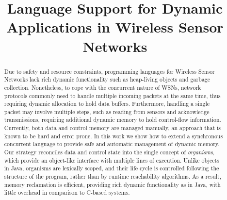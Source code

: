 \documentclass{llncs}
\begin{document}
\title{Language Support for Dynamic Applications in Wireless Sensor Networks}

\begin{comment}
\author{
John Smith and Mary Smith}
\institute{University of North Texas\\
           Computer Science Department\\
           Denton, TX, 76203-1366\\
           john@unt.edu, mary@cs.unt.edu}
\end{comment}

\maketitle

\begin{abstract}

Due to safety and resource constraints, programming languages for Wireless 
Sensor Networks lack rich dynamic functionality such as heap-living objects and 
garbage collection.
%
Nonetheless, to cope with the concurrent nature of WSNs, network protocols 
commonly need to handle multiple incoming packets at the same time, thus 
requiring dynamic allocation to hold data buffers.
%
Furthermore, handling a single packet may involve multiple steps, such as 
reading from sensors and acknowledge transmissions, requiring additional 
dynamic memory to hold control-flow information.
%
Currently, both data and control memory are managed manually, an approach that 
is known to be hard and error prone.
%
In this work we show how to extend a synchronous concurrent language to provide 
safe and automatic management of dynamic memory.
Our strategy reconciles data and control state into the single concept of 
\emph{organisms}, which provide an object-like interface with multiple lines of 
execution.
%
Unlike objects in Java, organisms are lexically scoped, and their life cycle is 
controlled following the structure of the program, rather than by runtime 
reachability algorithms.
%
As a result, memory reclamation is efficient, providing rich dynamic 
functionality as in Java, with little overhead in comparison to C-based 
systems.

\begin{comment}
By default, references to organisms are not allowed to escape their scope, xxx 
safety.

can be optionally allocated on the stack, memory pool, or heap, depending on 
the level of flexibility required in the program.
In all cases, memory reclamation is made automatically following lexical scope, 
thus avoiding... and more efficiently than garbage collectors.

The data and control memory is then handled either by asynchronous 
communication primitives (in event-driven systems) or by predefined number of 
worker threads (in multi-threaded systems).

Dynamic behavior in applications in Wireless Sensor Networks is a reality.
Wireless Sensor Networks are
\end{comment}

\end{abstract}
\end{document}
